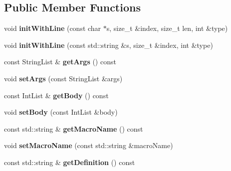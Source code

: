 \subsection*{Public Member Functions}
\begin{DoxyCompactItemize}
\item 
\mbox{\label{class_define_preprocessor_ae59f8c550eb2a7e393b29e54671bc313}} 
void {\bfseries init\+With\+Line} (const char $\ast$s, size\+\_\+t \&index, size\+\_\+t len, int \&type)
\item 
\mbox{\label{class_define_preprocessor_a26bd3fdc4f9e46034c6618216665de06}} 
void {\bfseries init\+With\+Line} (const std\+::string \&s, size\+\_\+t \&index, int \&type)
\item 
\mbox{\label{class_define_preprocessor_af9f161b798f293c736a1fd56bf6df12a}} 
const String\+List \& {\bfseries get\+Args} () const
\item 
\mbox{\label{class_define_preprocessor_a6e7905597e21e318de883ae8af865207}} 
void {\bfseries set\+Args} (const String\+List \&args)
\item 
\mbox{\label{class_define_preprocessor_a229418ee0bf5e3fd03ec4d374e8d94df}} 
const Int\+List \& {\bfseries get\+Body} () const
\item 
\mbox{\label{class_define_preprocessor_ae08e22d30f083cb61177244c861f4f08}} 
void {\bfseries set\+Body} (const Int\+List \&body)
\item 
\mbox{\label{class_define_preprocessor_ab4527473d5fce9081deb535e7d8df110}} 
const std\+::string \& {\bfseries get\+Macro\+Name} () const
\item 
\mbox{\label{class_define_preprocessor_a8c1a3c9d6f11505db5b751f7c0341779}} 
void {\bfseries set\+Macro\+Name} (const std\+::string \&macro\+Name)
\item 
\mbox{\label{class_define_preprocessor_a1e11e3eaf4d9f66a698e4163db502273}} 
const std\+::string \& {\bfseries get\+Definition} () const
\end{DoxyCompactItemize}

